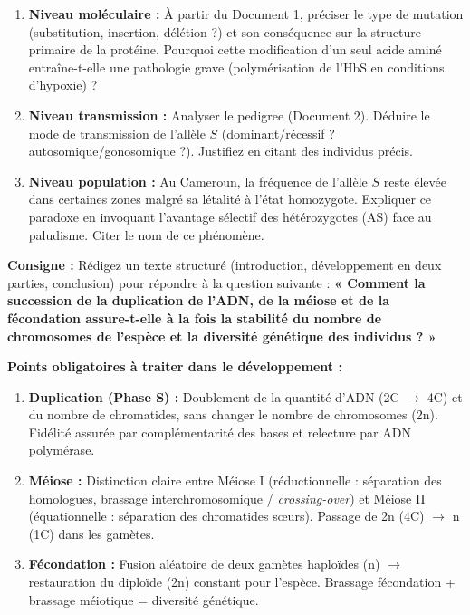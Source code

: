 \documentclass[11pt]{article}
\begin{document}
\begin{exercice}
\begin{enumerate}
    \item \textbf{Niveau moléculaire :} À partir du Document 1, préciser le type de mutation (substitution, insertion, délétion ?) et son conséquence sur la structure primaire de la protéine. Pourquoi cette modification d'un seul acide aminé entraîne-t-elle une pathologie grave (polymérisation de l'HbS en conditions d'hypoxie) ?
    \item \textbf{Niveau transmission :} Analyser le pedigree (Document 2). Déduire le mode de transmission de l'allèle $S$ (dominant/récessif ? autosomique/gonosomique ?). Justifiez en citant des individus précis.
    \item \textbf{Niveau population :} Au Cameroun, la fréquence de l'allèle $S$ reste élevée dans certaines zones malgré sa létalité à l'état homozygote. Expliquer ce paradoxe en invoquant l'avantage sélectif des hétérozygotes (AS) face au paludisme. Citer le nom de ce phénomène.
\end{enumerate}
\end{exercice}

\begin{exercice}
\textbf{Consigne :} Rédigez un texte structuré (introduction, développement en deux parties, conclusion) pour répondre à la question suivante :
\textbf{« Comment la succession de la duplication de l'ADN, de la méiose et de la fécondation assure-t-elle à la fois la stabilité du nombre de chromosomes de l'espèce et la diversité génétique des individus ? »}

\textbf{Points obligatoires à traiter dans le développement :}
\begin{enumerate}
    \item \textbf{Duplication (Phase S) :} Doublement de la quantité d'ADN (2C $\to$ 4C) et du nombre de chromatides, sans changer le nombre de chromosomes (2n). Fidélité assurée par complémentarité des bases et relecture par ADN polymérase.
    \item \textbf{Méiose :} Distinction claire entre Méiose I (réductionnelle : séparation des homologues, brassage interchromosomique / \emph{crossing-over}) et Méiose II (équationnelle : séparation des chromatides sœurs). Passage de 2n (4C) $\to$ n (1C) dans les gamètes.
    \item \textbf{Fécondation :} Fusion aléatoire de deux gamètes haploïdes (n) $\to$ restauration du diploïde (2n) constant pour l'espèce. Brassage fécondation + brassage méiotique = diversité génétique.
\end{enumerate}
\end{exercice}
\end{document}
